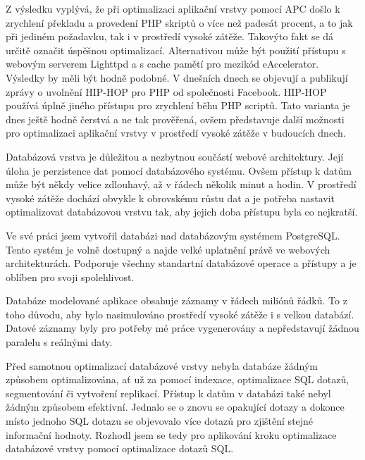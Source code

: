 \documentclass[12pt]{article}
\begin{document}
Z výsledku vyplývá, že při optimalizaci aplikační vrstvy pomocí APC došlo k zrychlení překladu a provedení PHP skriptů o více než padesát procent, a to jak při jediném požadavku, tak i v prostředí vysoké zátěže. Takovýto fakt se dá určitě označit úspěšnou optimalizací. Alternativou může být použití přístupu s webovým serverem Lighttpd a s cache pamětí pro mezikód eAccelerator. Výsledky by měli být hodně podobné. V dnešních dnech se objevují a publikují zprávy o uvolnění HIP-HOP pro PHP od společnosti Facebook. HIP-HOP používá úplně jiného přístupu pro zrychlení běhu PHP scriptů. Tato varianta je dnes ještě hodně čerstvá a ne tak prověřená, ovšem představuje další možnosti pro optimalizaci aplikační vrstvy v prostředí vysoké zátěže v budoucích dnech.

\obrazek
{}

\obrazek
{}

\clearpage

\obrazek
{}



Databázová vrstva je důležitou a nezbytnou součástí webové architektury. Její úloha je perzistence dat pomocí databázového systému. Ovšem přístup k datům může být někdy velice zdlouhavý, až v řádech několik minut a hodin. V prostředí vysoké zátěže dochází obvykle k obrovskému růstu dat a je potřeba nastavit optimalizovat databázovou vrstvu tak, aby jejich doba přístupu byla co nejkratší.

Ve své práci jsem vytvořil databázi nad databázovým systémem PostgreSQL. Tento systém je volně dostupný a najde velké uplatnění právě ve webových architekturách. Podporuje všechny standartní databázové operace a přístupy a je oblíben pro svoji spolehlivost.

Databáze modelované aplikace obsahuje záznamy v řádech miliónů řádků. To z toho důvodu, aby bylo nasimulováno prostředí vysoké zátěže i s velkou databází. Datové záznamy byly pro potřeby mé práce vygenerovány a nepředstavují žádnou paralelu s reálnými daty.

Před samotnou optimalizací databázové vrstvy nebyla databáze žádným způsobem optimalizována, ať už za pomocí indexace, optimalizace SQL dotazů, segmentování či vytvoření replikací. Přístup k datům v databázi také nebyl žádným způsobem efektivní. Jednalo se o znovu se opakující dotazy a dokonce místo jednoho SQL dotazu se objevovalo více dotazů pro zjištění stejné informační hodnoty. Rozhodl jsem se tedy pro aplikování kroku optimalizace databázové vrstvy pomocí optimalizace dotazů SQL.
\end{document}

